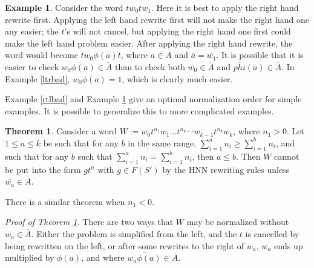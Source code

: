 \documentclass[11pt]{article} %
\theoremstyle{definition}
\newtheorem{theorem}{Theorem}[section]
\theoremstyle{definition}
\theoremstyle{definition}
\newtheorem{lemma}{Lemma}[theorem]
\theoremstyle{definition}
\theoremstyle{definition}
\theoremstyle{definition}
\newtheorem{exmpl}{Example}[theorem]
\begin{document}
\begin{exmpl}\label{ltrbad2}
  Consider the word $tw_0tw_1$. Here it is best to apply the right hand rewrite first.
  Applying the left hand rewrite first will not make the right hand one any easier; the $t$'s will
  not cancel, but applying the right hand one first could make the left hand problem easier.
  After applying the right hand rewrite, the word would become $tw_0\phi(a)t$, where $a \in A$
  and $\overline{a} = \overline{w_1}$. It is possible that it is easier to check $\overline{w_0\phi(a)} \in \overline{A}$
  than to check both $\overline{w_0} \in \overline{A}$ and $\overline{phi}(a) \in \overline{A}$. In Example
  \ref{ltrbad}, $w_0\phi(a) = 1$, which is clearly much easier.
\end{exmpl}

Example \ref{rtlbad} and Example \ref{ltrbad2} give an optimal normalization order
for simple examples. It is possible to generalize this to more complicated examples.



\begin{theorem}\label{rewriteorderthm}
  Consider a word $W := w_0t^{n_1}w_1 \dots t^{n_{k-1}}w_{k-1}t^{n_k}w_k$,
  where $n_1 > 0$. Let $1 \le a \le k$ be such that
  for any $b$ in the same range, $\sum_{i=1}^a n_i \ge \sum_{i=1}^b n_i$, and
  such that for any $b$ such that $\sum_{i=1}^a n_i = \sum_{i=1}^b n_i$, then $a \le b$.
  Then $W$ cannot be put into the form $gt^n$ with $g \in F(S')$ by the HNN
  rewriting rules unless $\overline{w_a} \in \overline{A}$.

  There is a similar theorem when $n_1 < 0$.
\end{theorem}

\textit{Proof of Theorem \ref{rewriteorderthm}.} There are two ways that $W$ may be normalized
without $\overline{w_a} \in \overline{A}$. Either the problem is simplified from the left, and the $t$
is cancelled by being rewritten on the left, or after some rewrites to the right of $w_a$, $w_a$
ends up multiplied by $\phi(a)$, and where $\overline{w_a\phi(a)} \in \overline{A}$.
\end{document}
